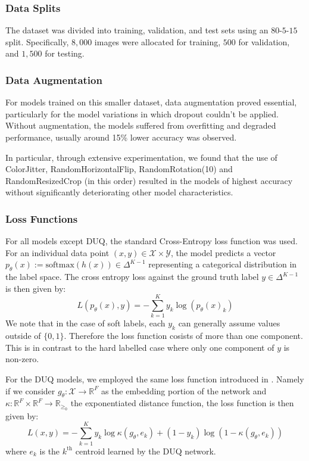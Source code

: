 \documentclass{article}
\begin{document}
\subsubsection*{Data Splits}
The dataset was divided into training, validation, and test sets using an $80$-$5$-$15$ split. Specifically, $8,000$ images were allocated for training, $500$ for validation, and $1,500$ for testing.
\subsubsection*{Data Augmentation}
For models trained on this smaller dataset, data augmentation proved essential, particularly for the model variations in which dropout couldn't be applied. Without augmentation, the models suffered from overfitting and degraded performance, usually around 15\% lower accuracy was observed.

In particular, through extensive experimentation, we found that the use of ColorJitter, RandomHorizontalFlip, RandomRotation(10) and  RandomResizedCrop (in this order) resulted in the models of highest accuracy without significantly deteriorating other model characteristics. 
\subsubsection*{Loss Functions}
For all models except DUQ, the standard Cross-Entropy loss function was used. 
For an individual data point $(x,y) \in \mathcal{X} \times \mathcal{Y}$, the model predicts a vector $p_{\theta}(x) := \text{softmax}(h(x)) \in\Delta^{K-1}$ representing a categorical distribution in the label space. The cross entropy loss against the ground truth label $y\in \Delta^{K-1}$ is then given by:
\[
	L(p_{\theta}(x), y) = -\sum_{k=1}^{K} {y_k \log (p_{\theta}(x)_k)}
\]
We note that in the case of soft labels, each $y_k$ can generally assume values outside of $\{0,1\} $. Therefore the loss function cosists of more than one component. This is in contrast to the hard labelled case where only one component of $y$ is non-zero.

For the DUQ models, we employed the same loss function introduced in \cite{duq}. Namely if we consider $g_{\theta}: \mathcal{X} \to \mathbb{R}^{F}$ as the embedding portion of the network and $\kappa: \mathbb{R}^{F} \times \mathbb{R}^F\to \mathbb{R}_{\ge_0}$ the exponentiated distance function, the loss function is then given by:
\[
L(x,y) = -\sum_{k=1}^{K} {y_k}\log \kappa(g_{\theta}, e_k) + (1-y_k) \log(1-\kappa(g_{\theta}, e_k))
\] 
where $e_k$ is the  $k^{\text{th}}$ centroid learned by the DUQ network.
\end{document}
